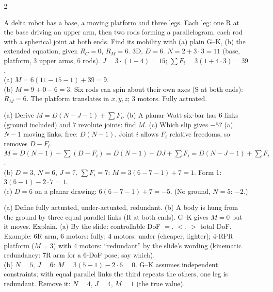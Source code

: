 \begin{multicols}{2}
\begin{examq}
\label{w1:q7}
A delta robot has a base, a moving platform and three legs. Each leg: one R at the base driving an upper arm, then two rods forming a parallelogram, each rod with a spherical joint at both ends. Find its mobility with (a) plain G--K, (b) the extended equation, given $R_C=0$, $R_M=6$.
\solution
3D, $D=6$. $N=2+3\cdot3=11$ (base, platform, 3 upper arms, 6 rods). $J=3\cdot(1+4)=15$; $\sum F_i=3(1+4\cdot3)=39$.\\
(a) $M=6(11-15-1)+39=\boxed{9}$.\\
(b) $M=9+0-6=\boxed{3}$. Six rods can spin about their own axes (S at both ends): $R_M=6$. The platform translates in $x,y,z$; 3 motors. Fully actuated. \chk
\end{examq}

\begin{examq}
(a) Derive $M=D(N-J-1)+\sum F_i$. (b) A planar Watt six-bar has 6 links (ground included) and 7 revolute joints: find $M$. (c) Which slip gives $-5$?
\solution
(a) $N-1$ moving links, free: $D(N-1)$. Joint $i$ allows $F_i$ relative freedoms, so removes $D-F_i$. $M=D(N-1)-\sum(D-F_i)=D(N-1)-DJ+\sum F_i=D(N-J-1)+\sum F_i$.\\
(b) $D=3$, $N=6$, $J=7$, $\sum F_i=7$: $M=3(6-7-1)+7=\boxed{1}$. Form 1: $3(6-1)-2\cdot7=1$.\\
(c) $D=6$ on a planar drawing: $6(6-7-1)+7=-5$. (No ground, $N=5$: $-2$.) \chk
\end{examq}

\begin{examq}
(a) Define fully actuated, under-actuated, redundant. (b) A body is hung from the ground by three equal parallel links (R at both ends). G--K gives $M=0$ but it moves. Explain.
\solution
(a) By the slide: controllable DoF $=$, $<$, $>$ total DoF. Example: 6R arm, 6 motors: fully; 4 motors: under (cheaper, lighter); 4-RPR platform ($M=3$) with 4 motors: ``redundant'' by the slide's wording (kinematic redundancy: 7R arm for a 6-DoF pose; say which).\\
(b) $N=5$, $J=6$: $M=3(5-1)-2\cdot6=\boxed0$. G--K assumes independent constraints; with equal parallel links the third repeats the others, one leg is redundant. Remove it: $N=4$, $J=4$, $M=\boxed1$ (the true value). \chk
\end{examq}


\end{multicols}
